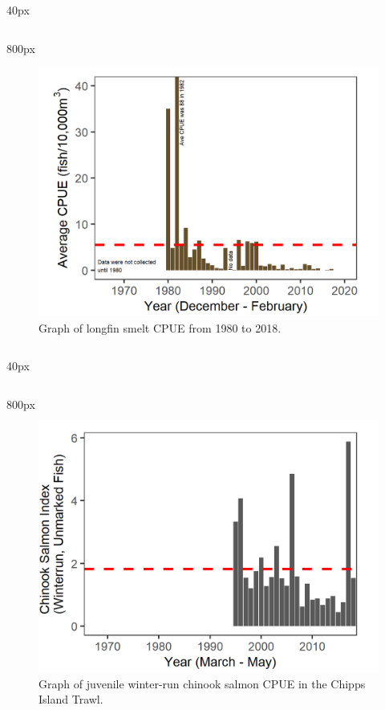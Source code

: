 \documentclass[
]{book}
\begin{document}
\begin{column}{40px\textwidth}
~
\end{column}

\begin{column}{800px\textwidth}
\begin{figure}
\includegraphics[width=15.25in]{figures/lonsme_plot_allYears} \caption{Graph of longfin smelt CPUE from 1980 to 2018. }\label{fig:unnamed-chunk-174}
\end{figure}
\end{column}

\begin{column}{40px\textwidth}
~
\end{column}

\begin{column}{800px\textwidth}
\begin{figure}
\includegraphics[width=15.25in]{figures/DJFMP_chinook_winterByLength_allyears} \caption{Graph of juvenile winter-run chinook salmon CPUE in the Chipps Island Trawl.}\label{fig:unnamed-chunk-175}
\end{figure}
\end{column}
\end{document}
